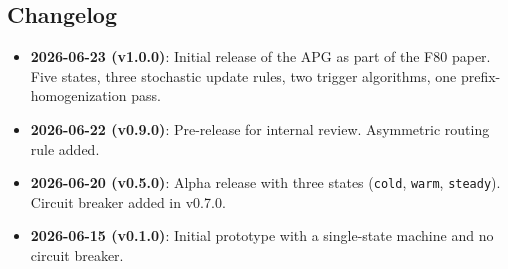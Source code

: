 \subsection{Changelog}
\label{app:apg:changelog}

\begin{itemize}
  \item \textbf{2026-06-23 (v1.0.0)}: Initial release of the
        APG as part of the F80 paper. Five states, three
        stochastic update rules, two trigger algorithms, one
        prefix-homogenization pass.
  \item \textbf{2026-06-22 (v0.9.0)}: Pre-release for internal
        review. Asymmetric routing rule added.
  \item \textbf{2026-06-20 (v0.5.0)}: Alpha release with three
        states (\texttt{cold}, \texttt{warm}, \texttt{steady}).
        Circuit breaker added in v0.7.0.
  \item \textbf{2026-06-15 (v0.1.0)}: Initial prototype with
        a single-state machine and no circuit breaker.
\end{itemize}

